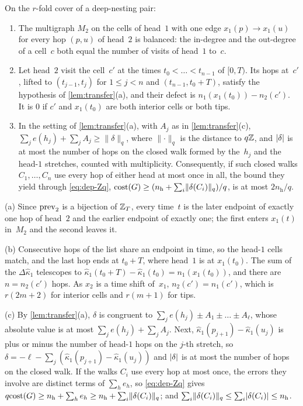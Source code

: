 \begin{lemma}\label{lem:dep-euler}
\notformalized
On the $r$-fold cover of a deep-nesting pair:
\begin{enumerate}[label=(\alph*)]
\item The multigraph $M_2$ on the cells of head~$1$ with one edge $x_1(p)\to x_1(u)$ for every hop $(p,u)$ of head~$2$
is balanced: the in-degree and the out-degree of a cell~$c$ both equal the number of visits of head~$1$ to~$c$.
\item Let head~$2$ visit the cell~$c'$ at the times $t_0<\dots<t_{n-1}$ of $[0,T)$. Its hops at~$c'$, lifted to
$(t_{j-1},t_j)$ for $1\le j<n$ and $(t_{n-1},t_0+T)$, satisfy the hypothesis of \cref{lem:transfer}(a), and their
defect is $n_1(x_1(t_0))-n_2(c')$. It is $0$ if $c'$ and $x_1(t_0)$ are both interior cells or both tips.
\item In the setting of \cref{lem:transfer}(a), with $A_j$ as in \cref{lem:transfer}(c),
$\sum_je(h_j)+\sum_jA_j\ge\lVert \delta\rVert_q$, where $\lVert
\cdot\rVert_q$
is the distance to $q\mathbb{Z}$, and $\lvert \delta \rvert$ is at most the number of hops on the closed walk formed by the~$h_j$ and the
head-$1$ stretches, counted with multiplicity. Consequently, if such closed walks $C_1,\dots,C_n$ use every hop of
either head at most once in all, the bound they yield through \eqref{eq:dep-Zq},
$\mathrm{cost}(G)\ge(n_{\mathrm h}+\sum_i\lVert \delta(C_i)\rVert_q)/q$, is at most $2n_{\mathrm h}/q$.
\end{enumerate}
\end{lemma}

\begin{informalproof}
(a) Since $\mathrm{prev}_2$ is a bijection of $\mathbb{Z}_T$, every time~$t$ is the later endpoint of exactly one hop of head~$2$ and
the earlier endpoint of exactly one; the first enters $x_1(t)$ in~$M_2$ and the second leaves it.

(b) Consecutive hops of the list share an endpoint in time, so the head-$1$ cells match, and the last hop ends at
$t_0+T$, where head~$1$ is at $x_1(t_0)$. The sum of the $\Delta\hat\kappa_1$ telescopes to
$\hat\kappa_1(t_0+T)-\hat\kappa_1(t_0)=n_1(x_1(t_0))$, and there are $n=n_2(c')$ hops. As $x_2$ is a time shift
of~$x_1$, $n_2(c')=n_1(c')$, which is $r(2m+2)$ for interior cells and $r(m+1)$ for tips.

(c) By \cref{lem:transfer}(a), $\delta$ is congruent to $\sum_je(h_j)\pm A_1\pm\dots\pm A_\ell$, whose absolute value
is at most $\sum_je(h_j)+\sum_jA_j$. Next, $\hat\kappa_1(p_{j+1})-\hat\kappa_1(u_j)$ is plus or minus the number of
head-$1$ hops on the $j$-th stretch, so $\delta=-\ell-\sum_j(\hat\kappa_1(p_{j+1})-\hat\kappa_1(u_j))$ and $\lvert \delta \rvert$
is at most the number of hops on the closed walk. If the walks $C_i$ use every hop at most once, the errors they involve
are distinct terms of $\sum_he_h$, so \eqref{eq:dep-Zq} gives $q\mathrm{cost}(G)\ge n_{\mathrm h}+\sum_he_h\ge
n_{\mathrm h}+\sum_i\lVert \delta(C_i)\rVert_q$; and $\sum_i\lVert \delta(C_i)\rVert_q\le\sum_i\lvert \delta(C_i) \rvert\le
n_{\mathrm h}$.
\end{informalproof}

